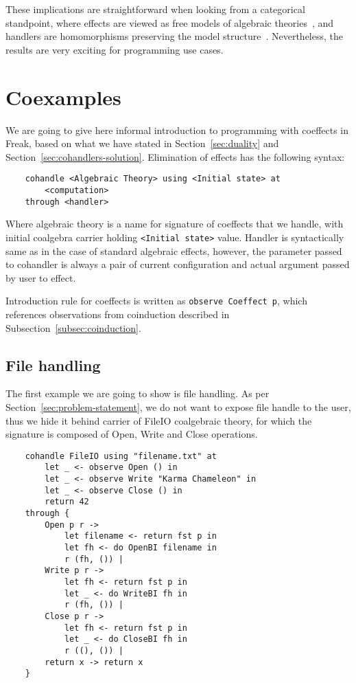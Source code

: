\documentclass[declaration,shortabstract]{iithesis}
\theoremstyle{definition} \newtheorem{definition}{Definition}[chapter]
\theoremstyle{remark} \newtheorem{remark}[definition]{Observation}
\theoremstyle{plain} \newtheorem{theorem}[definition]{Theorem}
\theoremstyle{plain} \newtheorem{lemma}[definition]{Lemma}
\begin{document}
    These implications are straightforward when looking from a categorical standpoint,
    where effects are viewed as free models of algebraic theories~\cite{adequacy},
    and handlers are homomorphisms preserving the model structure~\cite{handlers}.
    Nevertheless, the results are very exciting for programming use cases.

\section{Coexamples}\label{sec:coexamples}

    We are going to give here informal introduction to programming with
    coeffects in Freak, based on what we have stated in
    Section~\ref{sec:duality} and Section~\ref{sec:cohandlers-solution}.
    Elimination of effects has the following syntax:

\begin{verbatim}
    cohandle <Algebraic Theory> using <Initial state> at
        <computation>
    through <handler>
\end{verbatim}

    Where algebraic theory is a name for signature of coeffects that we
    handle, with initial coalgebra carrier holding \verb!<Initial state>! value.
    Handler is syntactically same as in the case of standard algebraic effects,
    however, the parameter passed to cohandler is always a pair of
    current configuration and actual argument passed by user to effect.

    Introduction rule for coeffects is written as \verb!observe Coeffect p!,
    which references observations from coinduction described in
    Subsection~\ref{subsec:coinduction}.

    \subsection{File handling}

    The first example we are going to show is file handling. As per
    Section~\ref{sec:problem-statement}, we do not want to expose file handle
    to the user, thus we hide it behind carrier of FileIO coalgebraic theory,
    for which the signature is composed of Open, Write and Close operations.

\begin{verbatim}
    cohandle FileIO using "filename.txt" at
        let _ <- observe Open () in
        let _ <- observe Write "Karma Chameleon" in
        let _ <- observe Close () in
        return 42
    through {
        Open p r ->
            let filename <- return fst p in
            let fh <- do OpenBI filename in
            r (fh, ()) |
        Write p r ->
            let fh <- return fst p in
            let _ <- do WriteBI fh in
            r (fh, ()) |
        Close p r ->
            let fh <- return fst p in
            let _ <- do CloseBI fh in
            r ((), ()) |
        return x -> return x
    }
\end{verbatim}
\end{document}
